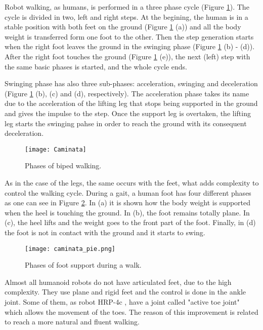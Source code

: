 Robot walking, as humans, is performed in a three phase cycle (Figure \ref{fig:caminata}). The cycle is divided in two, left and right steps. At the begining, the human is in a stable position with both feet on the ground (Figure \ref{fig:caminata} (a)) and all the body weight is transferred form one foot to the other. Then the step generation starts when the right foot leaves the ground in the swinging phase (Figure \ref{fig:caminata} (b) - (d)). After the right foot touches the ground (Figure \ref{fig:caminata} (e)), the next (left) step with the same basic phases is started, and the whole cycle ends.

Swinging phase has also three sub-phases: acceleration, swinging and deceleration (Figure \ref{fig:caminata} (b), (c) and (d), respectively). The acceleration phase takes its name due to the acceleration of the lifting leg that stops being supported in the ground and gives the impulse to the step. Once the support leg is overtaken, the lifting leg starts the swinging pahse in order to reach the ground with its consequent deceleration.

\begin{figure}[!hbt]
\centering
\texttt{[image: Caminata]}
\caption{Phases of biped walking.}
\label{fig:caminata}
\end{figure}

As in the case of the legs, the same occurs with the feet, what adds complexity to control the walking cycle. During a gait, a human foot has four different phases as one can see in Figure \ref{fig:caminata_pie}. In (a) it is shown how the body weight is supported when the heel is touching the ground. In (b), the foot remains totally plane. In (c), the heel lifts and the weight goes to the front part of the foot. Finally, in (d) the foot is not in contact with the ground and it starts to swing.

\begin{figure}[!hbt]
\centering
\texttt{[image: caminata\_pie.png]}
\caption{Phases of foot support during a walk.}
\label{fig:caminata_pie}
\end{figure}

Almost all humanoid robots do not have articulated feet, due to the high complexity. They use plane and rigid feet and the control is done in the ankle joint. Some of them, as robot HRP-4c \cite{Kan2011}, have a joint called "active toe joint" which allows the movement of the toes. The reason of this improvement is related to reach a more natural and fluent walking.

